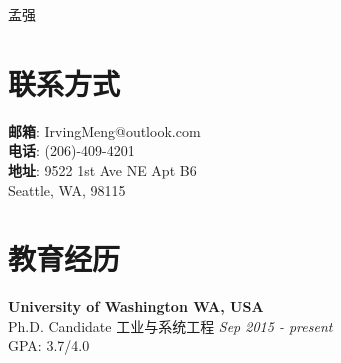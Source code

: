 \documentclass[margin,line,11pt]{resume}
\begin{document}
{\sc \Huge 孟强}

\begin{resume}



 
            \vspace{-0.5em}\section{\mysidestyle 联系方式}
    \textbf{邮箱}:\hspace{1.5em}  IrvingMeng@outlook.com \\
    \textbf{电话}: \hspace{1.5em} (206)-409-4201\\ 
    \textbf{地址}: \hspace{1.5em}9522 1st Ave NE Apt B6\\
     \hspace*{4.5em}Seattle, WA, 98115 


             \vspace{-0.5em}\section{\mysidestyle 教育经历}
     \textbf{University of Washington  \hfill WA, USA}\\
Ph.D. Candidate \quad  工业与系统工程 \hfill \textit{Sep 2015 - present}\\
 GPA: 3.7/4.0 


\end{resume}
\end{document}
